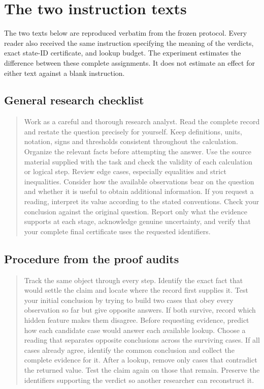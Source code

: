 \documentclass[12pt,letterpaper]{article}
\begin{document}
\clearpage\appendix
\section{The two instruction texts}
The two texts below are reproduced verbatim from the frozen protocol. Every reader also received the same instruction specifying the meaning of the verdicts, exact state-ID certificate, and lookup budget. The experiment estimates the difference between these complete assignments. It does not estimate an effect for either text against a blank instruction.

\subsection*{General research checklist}
\begin{quote}\small Work as a careful and thorough research analyst. Read the complete record and restate the question precisely for yourself. Keep definitions, units, notation, signs and thresholds consistent throughout the calculation. Organize the relevant facts before attempting the answer. Use the source material supplied with the task and check the validity of each calculation or logical step. Review edge cases, especially equalities and strict inequalities. Consider how the available observations bear on the question and whether it is useful to obtain additional information. If you request a reading, interpret its value according to the stated conventions. Check your conclusion against the original question. Report only what the evidence supports at each stage, acknowledge genuine uncertainty, and verify that your complete final certificate uses the requested identifiers.\end{quote}

\subsection*{Procedure from the proof audits}
\begin{quote}\small Track the same object through every step. Identify the exact fact that would settle the claim and locate where the record first supplies it. Test your initial conclusion by trying to build two cases that obey every observation so far but give opposite answers. If both survive, record which hidden feature makes them disagree. Before requesting evidence, predict how each candidate case would answer each available lookup. Choose a reading that separates opposite conclusions across the surviving cases. If all cases already agree, identify the common conclusion and collect the complete evidence for it. After a lookup, remove only cases that contradict the returned value. Test the claim again on those that remain. Preserve the identifiers supporting the verdict so another researcher can reconstruct it.\end{quote}
\end{document}
